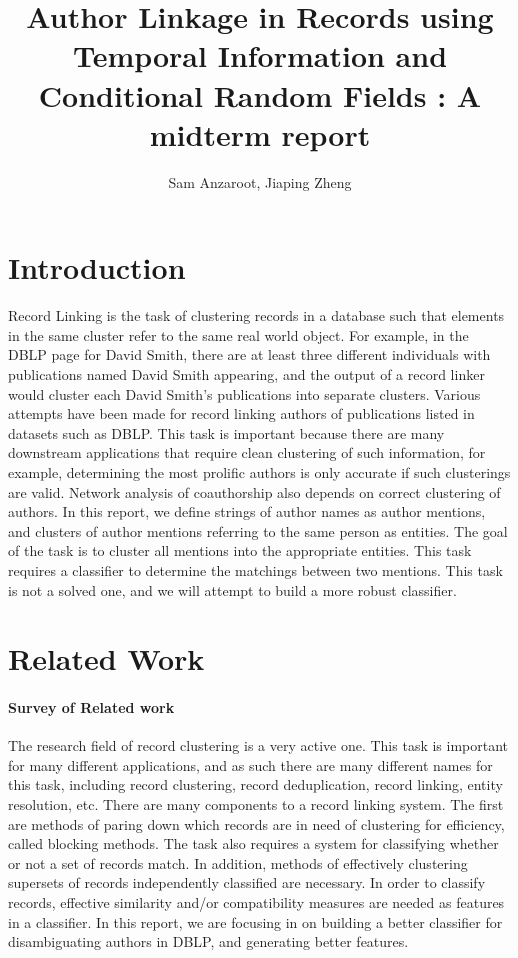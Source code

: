 \documentclass[twocolumn,letterpaper]{article}
\title{Author Linkage in Records using Temporal Information and Conditional Random Fields : A midterm report}
\author{Sam Anzaroot, Jiaping Zheng}
\date{}
\begin{document}
\ifpdf
{}
\else
{}
\fi

\maketitle

\section{Introduction} %
\label{sec:introduction}
Record Linking is the task of clustering records in a database such that elements in the same cluster refer to the same real world object. For example, in the DBLP page for David Smith, there are at least three different individuals with publications named David Smith appearing, and the output of a record linker would cluster each David Smith's publications into separate clusters. Various attempts have been made for record linking authors of publications listed in datasets such as DBLP. This task is important because there are many downstream applications that require clean clustering of such information, for example, determining the most prolific authors is only accurate if such clusterings are valid. Network analysis of coauthorship also depends on correct clustering of authors. In this report, we define strings of author names as author mentions, and clusters of author mentions referring to the same person as entities. The goal of the task is to cluster all mentions into the appropriate entities. This task requires a classifier to determine the matchings between two mentions. This task is not a solved one, and we will attempt to build a more robust classifier.

\section{Related Work} %
\label{sec:related_work}
\paragraph{Survey of Related work} %
\label{par:survey_of_related_work}
The research field of record clustering is a very active one. This task is important for many different applications, and as such there are many different names for this task, including record clustering, record deduplication, record linking, entity resolution, etc. There are many components to a record linking system. The first are methods of paring down which records are in need of clustering for efficiency, called blocking methods. The task also requires a system for classifying whether or not a set of records match. In addition, methods of effectively clustering supersets of records independently classified are necessary. In order to classify records, effective similarity and/or compatibility measures are needed as features in a classifier. In this report, we are focusing in on building a better classifier for disambiguating authors in DBLP, and generating better features.
\end{document}
